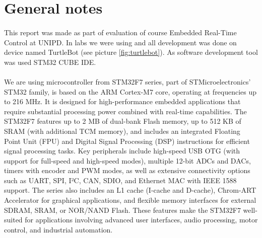 \documentclass[english]{article}
\begin{document}
\tableofcontents
\newpage

\section{General notes}
	\paragraph{}
	This report was made as part of evaluation of course Embedded Real-Time Control at UNIPD.
	In labs we were using and all development was done on device named TurtleBot (see picture \ref{fig:turtlebot}).
	As software development tool was used STM32 CUBE IDE.

	\paragraph{}
	We are using microcontroller from STM32F7 series, part of STMicroelectronics' STM32 family, is based on the ARM Cortex-M7 core, operating at frequencies up to 216 MHz. 
	It is designed for high-performance embedded applications that require substantial processing power combined with real-time capabilities. 
	The STM32F7 features up to 2 MB of dual-bank Flash memory, up to 512 KB of SRAM (with additional TCM memory), and includes an integrated 
	Floating Point Unit (FPU) and Digital Signal Processing (DSP) instructions for efficient signal processing tasks. Key peripherals include 
	high-speed USB OTG (with support for full-speed and high-speed modes), multiple 12-bit ADCs and DACs, timers with encoder and PWM modes,
	as well as extensive connectivity options such as UART, SPI, I²C, CAN, SDIO, and Ethernet MAC with IEEE 1588 support.
	The series also includes an L1 cache (I-cache and D-cache), Chrom-ART Accelerator for graphical applications, 
	and flexible memory interfaces for external SDRAM, SRAM, or NOR/NAND Flash.
	These features make the STM32F7 well-suited for applications involving advanced user interfaces, audio processing, motor control,
	and industrial automation.
\end{document}
